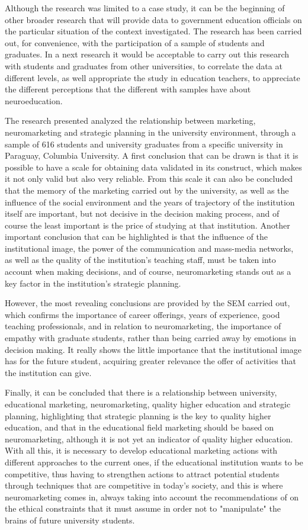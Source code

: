 \documentclass[english]{textolivre}
\begin{document}
Although the research was limited to a case study, it can be the beginning of other broader research that will provide data to government education officials on the particular situation of the context investigated. The research has been carried out, for convenience, with the participation of a sample of students and graduates. In a next research it would be acceptable to carry out this research with students and graduates from other universities, to correlate the data at different levels, as well appropriate the study in education teachers, to appreciate the different perceptions that the different with samples have about neuroeducation.

The research presented analyzed the relationship between marketing, neuromarketing and strategic planning in the university environment, through a sample of 616 students and university graduates from a specific university in Paraguay, Columbia University. A first conclusion that can be drawn is that it is possible to have a scale for obtaining data validated in its construct, which makes it not only valid but also very reliable. From this scale it can also be concluded that the memory of the marketing carried out by the university, as well as the influence of the social environment and the years of trajectory of the institution itself are important, but not decisive in the decision making process, and of course the least important is the price of studying at that institution. Another important conclusion that can be highlighted is that the influence of the institutional image, the power of the communication and mass-media networks, as well as the quality of the institution's teaching staff, must be taken into account when making decisions, and of course, neuromarketing stands out as a key factor in the institution's strategic planning.

However, the most revealing conclusions are provided by the SEM carried out, which confirms the importance of career offerings, years of experience, good teaching professionals, and in relation to neuromarketing, the importance of empathy with graduate students, rather than being carried away by emotions in decision making. It really shows the little importance that the institutional image has for the future student, acquiring greater relevance the offer of activities that the institution can give.

Finally, it can be concluded that there is a relationship between university, educational marketing, neuromarketing, quality higher education and strategic planning, highlighting that strategic planning is the key to quality higher education, and that in the educational field marketing should be based on neuromarketing, although it is not yet an indicator of quality higher education. With all this, it is necessary to develop educational marketing actions with different approaches to the current ones, if the educational institution wants to be competitive, thus having to strengthen actions to attract potential students through techniques that are competitive in today's society, and this is where neuromarketing comes in, always taking into account the recommendations of \textcite{lyu_problemas_2021} on the ethical constraints that it must assume in order not to "manipulate" the brains of future university students.
\end{document}
